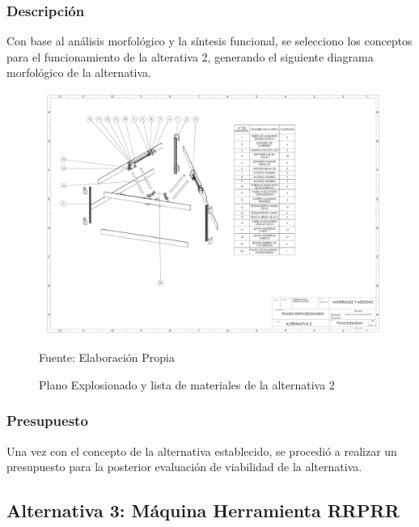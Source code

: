 \subsubsection{Descripción }
Con base al análisis morfológico y la síntesis funcional, se selecciono los conceptos para el funcionamiento de la alterativa 2, generando el siguiente diagrama morfológico de la alternativa.


\begin{figure}[htb!]
    \centering
    \includegraphics[width =  \textwidth]{Cap3_DisenoConceptual/Figura/Poncho.pdf}
    \caption{Plano Explosionado y lista de materiales de la alternativa 2}{Fuente: Elaboración Propia}
    \label{fig:Plano_alt_2}
\end{figure}

\newpage

\subsubsection{Presupuesto}
Una vez con el concepto de la alternativa establecido, se procedió a realizar un presupuesto para la posterior evaluación de viabilidad de la alternativa.



\subsection{Alternativa 3: Máquina Herramienta RRPRR}

